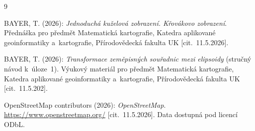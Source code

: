 \documentclass[11pt, a4paper]{article}
\begin{document}
\newpage
\renewcommand{\refname}{Zdroje} 
\begin{thebibliography}{9}

 BAYER, T. (2026): \textit{Jednoduchá kuželová zobrazení. Křovákovo zobrazení}. Přednáška pro předmět Matematická kartografie, Katedra aplikované geoinformatiky a~kartografie, Přírodovědecká fakulta UK [cit.~11.5.2026].

 BAYER, T. (2026): \textit{Transformace zeměpisných souřadnic mezi elipsoidy} (stručný návod k~úloze~1). Výukový materiál pro předmět Matematická kartografie, Katedra aplikované geoinformatiky a~kartografie, Přírodovědecká fakulta UK [cit.~11.5.202].

 OpenStreetMap contributors (2026): \textit{OpenStreetMap}. \url{https://www.openstreetmap.org/} [cit.~11.5.2026]. Data dostupná pod licencí ODbL.

\end{thebibliography}
\end{document}
